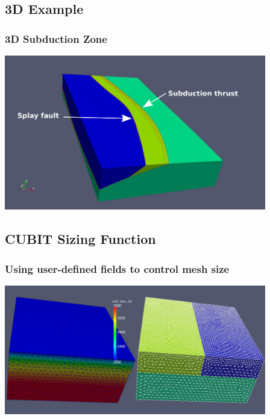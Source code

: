 \documentclass{beamer}
\begin{document}
\subsection{3D Example}

\begin{frame}
  \frametitle{3D Subduction Zone}
 
  \vfill
  \begin{center}
    \includegraphics[width=4.5in]{figs/subduction3d_mesh}
  \end{center}
  \vfill

\end{frame}


\subsection{CUBIT Sizing Function}

\begin{frame}
  \frametitle{Using user-defined fields to control mesh size}
 
  \vfill
  \begin{center}
    \includegraphics[width=4.5in]{figs/cellsize_mesh_spatialdb}
  \end{center}
  \vfill
 
\end{frame}
\end{document}
